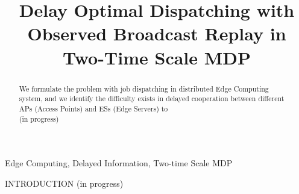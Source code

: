 \documentclass[10pt, conference, letterpaper]{IEEEtran}
\begin{document}
    \title{
        Delay Optimal Dispatching with Observed Broadcast Replay in Two-Time Scale MDP
    }
    \author{
    }
    \maketitle

    \begin{abstract}
        \label{sec:abstract}
        We formulate the problem with job dispatching in distributed Edge Computing system, and we identify the difficulty exists in delayed cooperation between different APs (Access Points) and ESs (Edge Servers) to 
        \\
        (in progress)
    \end{abstract}

    \begin{IEEEkeywords}
        Edge Computing, Delayed Information, Two-time Scale MDP
    \end{IEEEkeywords}

    \begin{section}{INTRODUCTION}
        \label{sec:introduction}
        (in progress)
        \cite{sutton1998introduction}
    \end{section}

\end{document}
